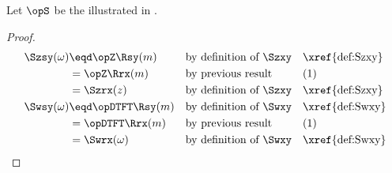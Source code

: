 \begin{corollary}
\label{cor:dual_addnoise}
Let $\opS$ be the  illustrated in .
\end{corollary}
\begin{proof}
\begin{align*}
  \Szsy(\omega)
    &\eqd \opZ\Rsy(m)
    && \text{by definition of $\Szxy$}
    && \text{\xref{def:Szxy}}
  \\&= \opZ\Rrx(m)
    && \text{by previous result}
    && \text{(1)}
  \\&= \Szrx(z)
    && \text{by definition of $\Szxy$}
    && \text{\xref{def:Szxy}}
  \\
  \Swsy(\omega)
    &\eqd \opDTFT\Rsy(m)
    && \text{by definition of $\Swxy$}
    && \text{\xref{def:Swxy}}
  \\&= \opDTFT\Rrx(m)
    && \text{by previous result}
    && \text{(1)}
  \\&= \Swrx(\omega)
    && \text{by definition of $\Swxy$}
    && \text{\xref{def:Swxy}}
\end{align*}
\end{proof}

